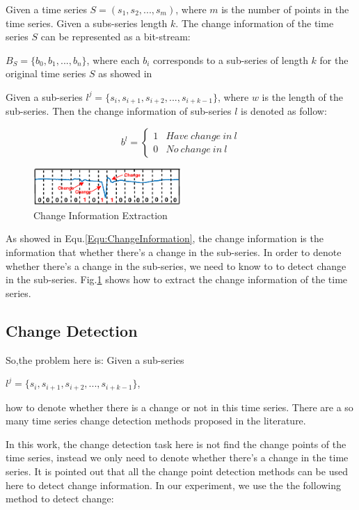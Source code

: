 Given a time series $S = (s_1,s_2,...,s_m)$, where $m$ is the number of points in the time series. Given a subs-series length $k$. The change information of the time series $S$ can be represented as a bit-stream:

$B_S = \{b_0,b_1,...,b_n\}$, where each $b_i$ corresponds to a sub-series of length $k$ for the original time series $S$ as showed in 

Given a sub-series $l^j = \{s_i,s_{i+1},s_{i+2},...,s_{i+k-1}\}$, where $w$ is the length of the sub-series. Then the change information of sub-series $l$ is denoted as follow:

\begin{equation}
\label{Equ:ChangeInformation}
b^l = \left\{\begin{matrix}
1 & Have~change~in~l
\\ 
0 & No~change~in~l
\end{matrix}\right.
\end{equation}

\begin{figure}[t]
\centering
\includegraphics[width=0.5\textwidth]{changeExtraction.eps}
\caption{Change Information Extraction}
\label{fig:ChangeMapping}
\end{figure}

As showed in Equ.\ref{Equ:ChangeInformation}, the change information is the information that whether there's a change in the sub-series. In order to denote whether there's a change in the sub-series, we need to know to to detect change in the sub-series.
Fig.\ref{fig:ChangeMapping} shows how to extract the change information of the time series.

\subsection{Change Detection}
\label{sec:changeDetect}
So,the problem here is:
Given a sub-series 

$l^j = \{s_i,s_{i+1},s_{i+2},...,s_{i+k-1}\}$, 

how to denote whether there is a change or not in this time series.
There are a so many time series change detection methods \cite{liu2013change,chen2013contextual} proposed in the literature. 

In this work, the change detection task here is not find the change points of the time series, instead we only need to denote whether there's a change in the time series. It is pointed out that all the change point detection methods can be used here to detect change information.
In our experiment, we use the the following method to detect change:

